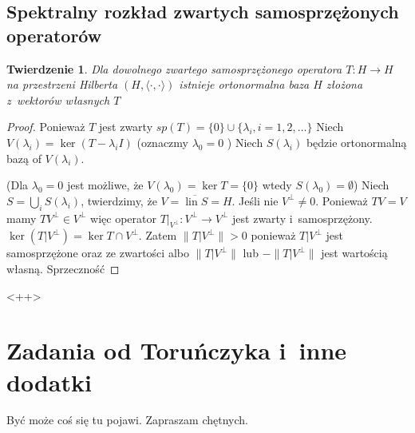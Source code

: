 \documentclass[11pt]{mwrep}
\renewcommand{\[}{\begin{equation}}
\renewcommand{\]}{\end{equation}}
\newcommand{\lin}{\operatorname{lin}}
\newcommand{\scal}{\langle \cdot,\cdot \rangle}
\newtheorem{twr}[subsection]{Twierdzenie}%
\begin{document}
\section{Spektralny rozkład zwartych samosprzężonych operatorów}
\begin{twr}
	Dla dowolnego zwartego samosprzężonego operatora $T\colon H \to H$ na przestrzeni Hilberta $(H, \scal)$ istnieje ortonormalna baza
	$H$ złożona z~wektorów własnych $T$ 
\end{twr}
\begin{proof}
	Ponieważ $T$ jest zwarty $sp(T) = \{0\} \cup \{\lambda_i, i= 1,2,\ldots \}$
	Niech $V(\lambda_i) = \ker (T-\lambda_i I) $ (oznaczmy $\lambda_0 = 0$ )
	Niech $S(\lambda_i)$ będzie ortonormalną bazą of $V(\lambda_i)$.

	(Dla $\lambda_0 = 0$ jest możliwe, że $V(\lambda_0) = \ker T = \{0\}$ wtedy $S(\lambda_0) = \emptyset$)
 Niech $S = \bigcup_i S(\lambda_i)$, twierdzimy, że $V = \overline{\lin S}  =H$.
 Jeśli nie $V^\perp \not = 0$. Ponieważ $TV = V$ mamy $TV^\perp  \in V^\perp$ więc operator 
 $T|_{V^\perp} \colon V^\perp \to V^\perp$ jest zwarty i~samosprzężony. 
 $\ker(T|V^\perp) = \ker T \cap V^\perp$. 
 Zatem $\|T|V^\perp\|>0$ ponieważ $T|V^\perp$ jest samosprzężone oraz ze zwartości albo $\|T|V^\perp\|$ lub $-\|T |V^\perp\|$ jest wartością własną.
 Sprzeczność

\end{proof}<++>
\chapter{Zadania od Toruńczyka i~inne dodatki}
Być może coś się tu pojawi. Zapraszam chętnych. 
\newpage
\end{document}
